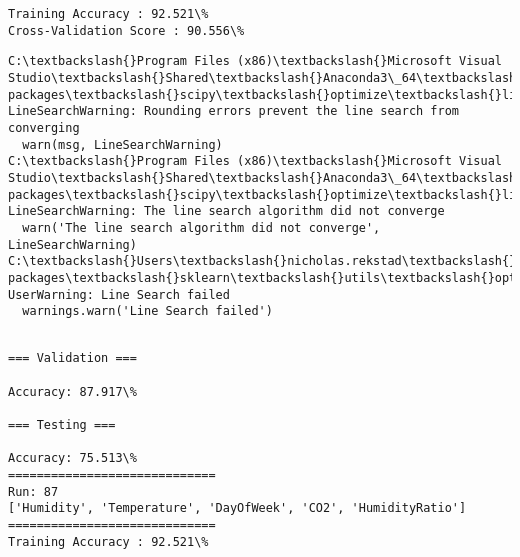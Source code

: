 \documentclass[11pt]{article}
\begin{document}
    \begin{Verbatim}[commandchars=\\\{\}]
Training Accuracy : 92.521\%
Cross-Validation Score : 90.556\%

    \end{Verbatim}

    \begin{Verbatim}[commandchars=\\\{\}]
C:\textbackslash{}Program Files (x86)\textbackslash{}Microsoft Visual Studio\textbackslash{}Shared\textbackslash{}Anaconda3\_64\textbackslash{}lib\textbackslash{}site-packages\textbackslash{}scipy\textbackslash{}optimize\textbackslash{}linesearch.py:422: LineSearchWarning: Rounding errors prevent the line search from converging
  warn(msg, LineSearchWarning)
C:\textbackslash{}Program Files (x86)\textbackslash{}Microsoft Visual Studio\textbackslash{}Shared\textbackslash{}Anaconda3\_64\textbackslash{}lib\textbackslash{}site-packages\textbackslash{}scipy\textbackslash{}optimize\textbackslash{}linesearch.py:313: LineSearchWarning: The line search algorithm did not converge
  warn('The line search algorithm did not converge', LineSearchWarning)
C:\textbackslash{}Users\textbackslash{}nicholas.rekstad\textbackslash{}AppData\textbackslash{}Roaming\textbackslash{}Python\textbackslash{}Python36\textbackslash{}site-packages\textbackslash{}sklearn\textbackslash{}utils\textbackslash{}optimize.py:195: UserWarning: Line Search failed
  warnings.warn('Line Search failed')

    \end{Verbatim}

    \begin{Verbatim}[commandchars=\\\{\}]

=== Validation ===

Accuracy: 87.917\%

=== Testing ===

Accuracy: 75.513\%
=============================
Run: 87
['Humidity', 'Temperature', 'DayOfWeek', 'CO2', 'HumidityRatio']
=============================
Training Accuracy : 92.521\%

    \end{Verbatim}
\end{document}
